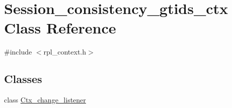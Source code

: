 \hypertarget{classSession__consistency__gtids__ctx}{}\section{Session\+\_\+consistency\+\_\+gtids\+\_\+ctx Class Reference}
\label{classSession__consistency__gtids__ctx}


{\ttfamily \#include $<$rpl\+\_\+context.\+h$>$}

\subsection*{Classes}
\begin{DoxyCompactItemize}
\item 
class \mbox{\hyperlink{classSession__consistency__gtids__ctx_1_1Ctx__change__listener}{Ctx\+\_\+change\+\_\+listener}}
\end{DoxyCompactItemize}
